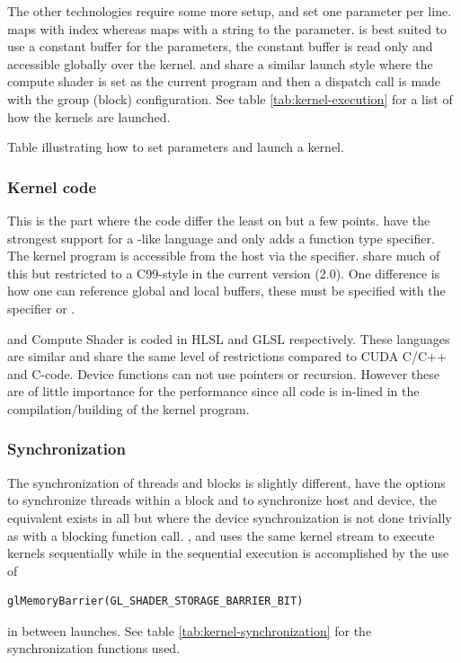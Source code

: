 The other technologies require some more setup, {\OCL} and {\GL} set one parameter per line. {\OCL} maps with index whereas {\GL} maps with a string to the parameter. {\DX} is best suited to use a constant buffer for the parameters, the constant buffer is read only and accessible globally over the kernel. {\DX} and {\GL} share a similar launch style where the compute shader is set as the current program and then a dispatch call is made with the group (block) configuration. See table \ref{tab:kernel-execution} for a list of how the kernels are launched.

\begin{table}[H]
	\centering
	
	\caption{Table illustrating how to set parameters and launch a kernel.}
	\label{tab:kernel-execution}
\end{table}

\subsubsection{Kernel code}

This is the part where the code differ the least on but a few points. {\CU} have the strongest support for a {\CPP} -like language and only adds a function type specifier. The kernel program is accessible from the host via the  specifier. {\OCL} share much of this but restricted to a C99-style in the current version (2.0). One difference is how one can reference global and local buffers, these must be specified with the specifier  or .

{\DX} and {\GL} Compute Shader is coded in \gls{HLSL} and \gls{GLSL} respectively. These languages are similar and share the same level of restrictions compared to CUDA C/C++ and {\OCL} C-code. Device functions can not use pointers or recursion. However these are of little importance for the performance since all code is in-lined in the compilation/building of the kernel program.

\subsubsection{Synchronization}

The synchronization of threads and blocks is slightly different, {\CU} have the options to synchronize threads within a block and to synchronize host and device, the equivalent exists in all but {\DX} where the device synchronization is not done trivially as with a blocking function call. {\CU}, {\OCL} and {\DX} uses the same kernel stream to execute kernels sequentially while in {\GL} the sequential execution is accomplished by the use of
\begin{lstlisting}
glMemoryBarrier(GL_SHADER_STORAGE_BARRIER_BIT)
\end{lstlisting}
in between launches. See table \ref{tab:kernel-synchronization} for the synchronization functions used.

